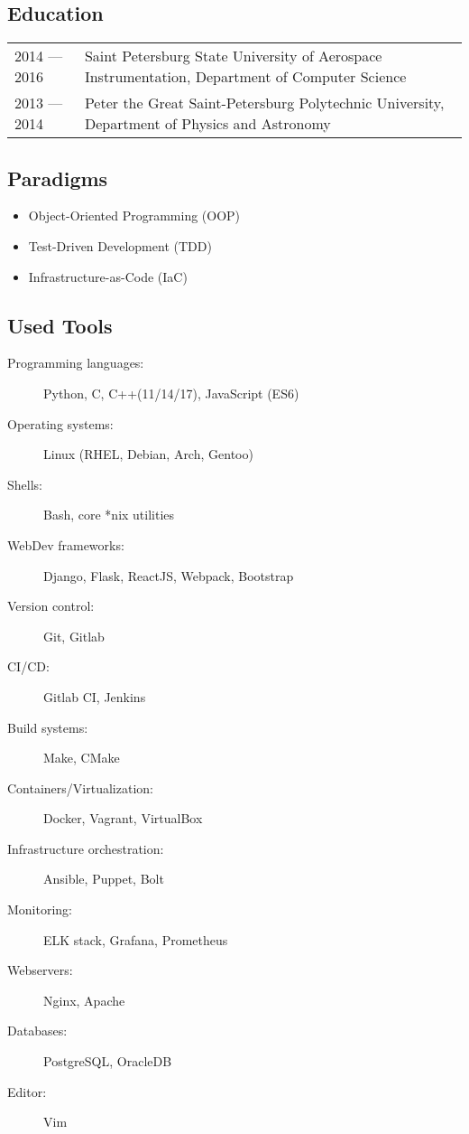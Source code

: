 \documentclass[11pt]{report}
\begin{document}
\subsection*{Education}
\begin{table}[H]
    \begin{tabular}{@{}p{}p{}}
        2014 --- 2016 & Saint Petersburg State University of Aerospace Instrumentation, Department of Computer Science \\
        2013 --- 2014 & Peter the Great Saint-Petersburg Polytechnic University, Department of Physics and Astronomy
    \end{tabular}
\end{table}

\subsection*{Paradigms}
\begin{itemize}
    \item Object-Oriented Programming (OOP)
    \item Test-Driven Development (TDD)
    \item Infrastructure-as-Code (IaC)
\end{itemize}

\subsection*{Used Tools}
\begin{description}
    \item[Programming languages:]
    Python, C, C++(11/14/17), JavaScript (ES6)
    \item[Operating systems:]
    Linux (RHEL, Debian, Arch, Gentoo)
    \item[Shells:]
    Bash, core *nix utilities
    \item[WebDev frameworks:]
    Django, Flask, ReactJS, Webpack, Bootstrap
    \item[Version control:]
    Git, Gitlab
    \item[CI/CD:]
    Gitlab CI, Jenkins
    \item[Build systems:]
    Make, CMake
    \item[Containers/Virtualization:]
    Docker, Vagrant, VirtualBox
    \item[Infrastructure orchestration:]
    Ansible, Puppet, Bolt
    \item[Monitoring:]
    ELK stack, Grafana, Prometheus
    \item[Webservers:]
    Nginx, Apache
    \item[Databases:]
    PostgreSQL, OracleDB
    \item[Editor:]
    Vim
\end{description}
\end{document}

